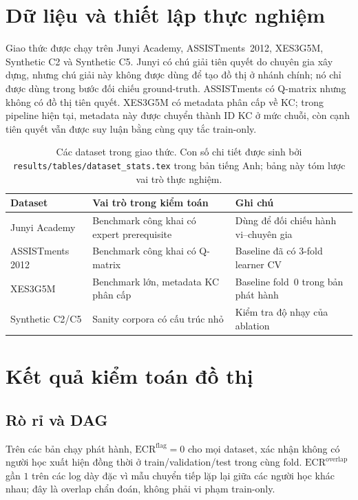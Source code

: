 \documentclass[runningheads]{llncs}
\begin{document}
\section{Dữ liệu và thiết lập thực nghiệm}
Giao thức được chạy trên Junyi Academy, ASSISTments~2012, XES3G5M, Synthetic C2 và Synthetic C5. Junyi có chú giải tiên quyết do chuyên gia xây dựng, nhưng chú giải này không được dùng để tạo đồ thị ở nhánh chính; nó chỉ được dùng trong bước đối chiếu ground-truth. ASSISTments có Q-matrix nhưng không có đồ thị tiên quyết. XES3G5M có metadata phân cấp về KC; trong pipeline hiện tại, metadata này được chuyển thành ID KC ở mức chuỗi, còn cạnh tiên quyết vẫn được suy luận bằng cùng quy tắc train-only.

\begin{table}[t]
\centering
\footnotesize
\caption{Các dataset trong giao thức. Con số chi tiết được sinh bởi \texttt{results/tables/dataset\_stats.tex} trong bản tiếng Anh; bảng này tóm lược vai trò thực nghiệm.}
\label{tab:vi-datasets}
\begin{tabularx}{\textwidth}{@{}lXl@{}}
\toprule
Dataset & Vai trò trong kiểm toán & Ghi chú \\
\midrule
Junyi Academy & Benchmark công khai có expert prerequisite & Dùng để đối chiếu hành vi--chuyên gia \\
ASSISTments 2012 & Benchmark công khai có Q-matrix & Baseline đã có 3-fold learner CV \\
XES3G5M & Benchmark lớn, metadata KC phân cấp & Baseline fold~0 trong bản phát hành \\
Synthetic C2/C5 & Sanity corpora có cấu trúc nhỏ & Kiểm tra độ nhạy của ablation \\
\bottomrule
\end{tabularx}
\end{table}

\section{Kết quả kiểm toán đồ thị}
\subsection{Rò rỉ và DAG}
Trên các bản chạy phát hành, $\mathrm{ECR}^{\mathrm{flag}}=0$ cho mọi dataset, xác nhận không có người học xuất hiện đồng thời ở train/validation/test trong cùng fold. $\mathrm{ECR}^{\mathrm{overlap}}$ gần $1$ trên các log dày đặc vì mẫu chuyển tiếp lặp lại giữa các người học khác nhau; đây là overlap chẩn đoán, không phải vi phạm train-only.
\end{document}
